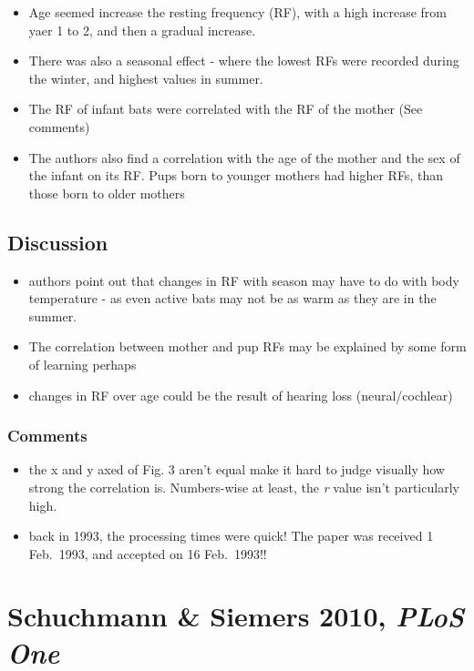 \documentclass[
]{book}
\providecommand{\tightlist}{%
  \setlength{\itemsep}{0pt}\setlength{\parskip}{0pt}}
\begin{document}
\begin{itemize}
\tightlist
\item
  Age seemed increase the resting frequency (RF), with a high increase from yaer 1 to 2, and then a gradual increase.
\item
  There was also a seasonal effect - where the lowest RFs were recorded during the winter, and highest values in summer.
\item
  The RF of infant bats were correlated with the RF of the mother (See comments)
\item
  The authors also find a correlation with the age of the mother and the sex of the infant on its RF. Pups born to younger mothers had higher RFs, than those born to older mothers
\end{itemize}

\hypertarget{discussion}{%
\section{Discussion}\label{discussion}}

\begin{itemize}
\tightlist
\item
  authors point out that changes in RF with season may have to do with body temperature - as even active bats may not be as warm as they are in the summer.
\item
  The correlation between mother and pup RFs may be explained by some form of learning perhaps
\item
  changes in RF over age could be the result of hearing loss (neural/cochlear)
\end{itemize}

\hypertarget{comments}{%
\subsection{Comments}\label{comments}}

\begin{itemize}
\tightlist
\item
  the x and y axed of Fig. 3 aren't equal make it hard to judge visually how strong the correlation is. Numbers-wise at least, the \emph{r} value isn't particularly high.
\item
  back in 1993, the processing times were quick! The paper was received 1 Feb.~1993, and accepted on 16 Feb.~1993!!
\end{itemize}

\hypertarget{schuchmann-siemers-2010-plos-one}{%
\chapter{\texorpdfstring{Schuchmann \& Siemers 2010, \emph{PLoS One}}{Schuchmann \& Siemers 2010, PLoS One}}\label{schuchmann-siemers-2010-plos-one}}
\end{document}
